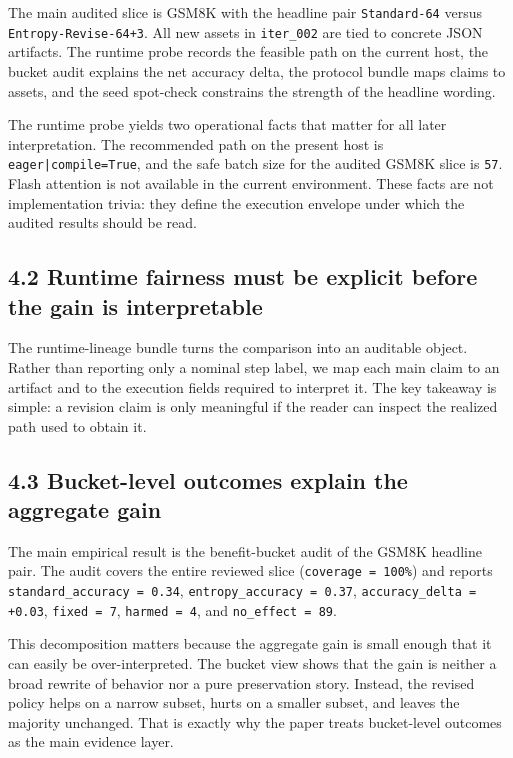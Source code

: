\documentclass{article}
\begin{document}
The main audited slice is GSM8K with the headline pair \texttt{Standard-64} versus \texttt{Entropy-Revise-64+3}. All new assets in \texttt{iter\_002} are tied to concrete JSON artifacts. The runtime probe records the feasible path on the current host, the bucket audit explains the net accuracy delta, the protocol bundle maps claims to assets, and the seed spot-check constrains the strength of the headline wording.

The runtime probe yields two operational facts that matter for all later interpretation. The recommended path on the present host is \texttt{eager|compile=True}, and the safe batch size for the audited GSM8K slice is \texttt{57}. Flash attention is not available in the current environment. These facts are not implementation trivia: they define the execution envelope under which the audited results should be read.

\subsection{4.2 Runtime fairness must be explicit before the gain is interpretable}

The runtime-lineage bundle turns the comparison into an auditable object. Rather than reporting only a nominal step label, we map each main claim to an artifact and to the execution fields required to interpret it. The key takeaway is simple: a revision claim is only meaningful if the reader can inspect the realized path used to obtain it.

\subsection{4.3 Bucket-level outcomes explain the aggregate gain}

The main empirical result is the benefit-bucket audit of the GSM8K headline pair. The audit covers the entire reviewed slice (\texttt{coverage = 100\%}) and reports \texttt{standard\_accuracy = 0.34}, \texttt{entropy\_accuracy = 0.37}, \texttt{accuracy\_delta = +0.03}, \texttt{fixed = 7}, \texttt{harmed = 4}, and \texttt{no\_effect = 89}.

This decomposition matters because the aggregate gain is small enough that it can easily be over-interpreted. The bucket view shows that the gain is neither a broad rewrite of behavior nor a pure preservation story. Instead, the revised policy helps on a narrow subset, hurts on a smaller subset, and leaves the majority unchanged. That is exactly why the paper treats bucket-level outcomes as the main evidence layer.
\end{document}

